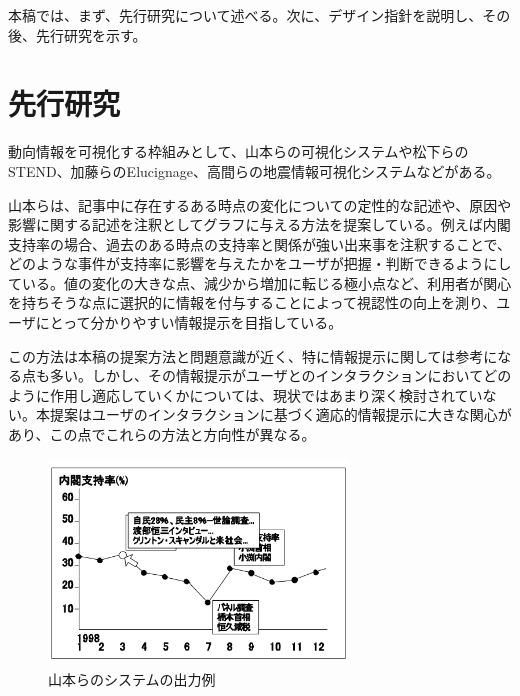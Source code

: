 \documentclass{matsushita-zemi}
\begin{document}
本稿では、まず、先行研究について述べる。次に、デザイン指針を説明し、その後、先行研究を示す。

\section{先行研究}
\label{relatedworks} 
動向情報を可視化する枠組みとして、山本らの可視化システム\cite{Tagged_corpus}や松下らのSTEND\cite{STEND}、加藤らのElucignage\cite{InformationcompiledStudyGroup}、高間らの地震情報可視化システム\cite{SpaceTrendInformation}などがある。

山本らは、記事中に存在するある時点の変化についての定性的な記述や、原因や影響に関する記述を注釈としてグラフに与える方法を提案している\cite{Tagged_corpus}。例えば内閣支持率の場合、過去のある時点の支持率と関係が強い出来事を注釈することで、どのような事件が支持率に影響を与えたかをユーザが把握・判断できるようにしている。値の変化の大きな点、減少から増加に転じる極小点など、利用者が関心を持ちそうな点に選択的に情報を付与することによって視認性の向上を測り、ユーザにとって分かりやすい情報提示を目指している。

この方法は本稿の提案方法と問題意識が近く、特に情報提示に関しては参考になる点も多い。しかし、その情報提示がユーザとのインタラクションにおいてどのように作用し適応していくかについては、現状ではあまり深く検討されていない。本提案はユーザのインタラクションに基づく適応的情報提示に大きな関心があり、この点でこれらの方法と方向性が異なる。

\begin{figure}[tb]
  \begin{center}
   \includegraphics[width=8cm,bb=0 0 521 356]{tagu.PNG}
  \end{center}
 \caption{山本らのシステムの出力例}
 \label{system}
\end{figure}
\end{document}
